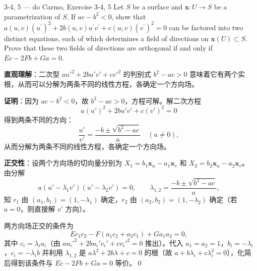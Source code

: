 \begin{exercise}{3-4, 5 — do Carmo, Exercise 3-4, 5}
Let $S$ be a surface and $\mathbf{x} \colon U \to S$ be a parametrization of $S$. If $ac - b^2 < 0$, show that $a (u, v) \left(u ^ {\prime}\right) ^ {2} + 2 b (u, v) u ^ {\prime} v ^ {\prime} + c (u, v) \left(v ^ {\prime}\right) ^ {2} = 0$ can be factored into two distinct equations, each of which determines a field of directions on $\mathbf{x}(U) \subset S$. Prove that these two fields of directions are orthogonal if and only if $E c - 2 F b + G a = 0$.
\end{exercise}
\begin{solution}
\textbf{直观理解}：二次型 $au'^2 + 2bu'v' + cv'^2$ 的判别式 $b^2-ac > 0$ 意味着它有两个实根，从而可以分解为两条不同的线性方程，各确定一个方向场。

\textbf{证明}：因为 $ac - b^2 < 0$，故 $b^2 - ac > 0$，方程可解。解二次方程
\[
a(u')^2 + 2bu'v' + c(v')^2 = 0
\]
得到两条不同的方向：
\[
\frac{u'}{v'} = \frac{-b \pm \sqrt{b^2 - ac}}{a}\quad (a \neq 0),
\]
从而分解为两条不同的线性方程，各确定一个方向场。

\textbf{正交性}：设两个方向场的切向量分别为 $X_1 = b_1\mathbf{x}_u - a_1\mathbf{x}_v$ 和 $X_2 = b_2\mathbf{x}_u - a_2\mathbf{x}_v$。由分解
\[
a(u'-\lambda_1 v')(u'-\lambda_2 v') = 0,\qquad \lambda_{1,2} = \frac{-b\pm\sqrt{b^2-ac}}{a},
\]
知 $r_1$ 由 $(a_1,b_1) = (1,-\lambda_1)$ 确定，$r_2$ 由 $(a_2,b_2) = (1,-\lambda_2)$ 确定（若 $a=0$，则直接解 $v'$ 方向）。

两方向场正交的条件为
\[
E c_1 c_2 - F(a_1 c_2 + a_2 c_1) + G a_1 a_2 = 0,
\]
其中 $c_i = \lambda_i a_i$（由 $au_i'^2 + 2bu_i'v_i' + cv_i'^2 = 0$ 推出）。代入 $a_1=a_2=1$，$b_i=-\lambda_i$，$c_i=-\lambda_i b$ 并利用 $\lambda_{1,2}$ 是 $a\lambda^2+2b\lambda+c=0$ 的根（故 $a+b\lambda_i+c\lambda_i^2=0$），化简后得到该条件与 $Ec - 2Fb + Ga = 0$ 等价。\qed
\end{solution}

